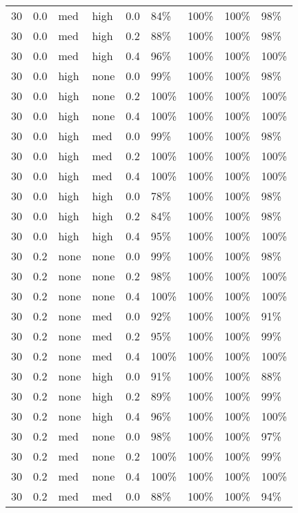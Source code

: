 \begin{longtable}{rrllrllll}
  30 & 0.0 & med & high & 0.0 & 84\% & 100\% & 100\% & 98\% \\ 
  30 & 0.0 & med & high & 0.2 & 88\% & 100\% & 100\% & 98\% \\ 
  30 & 0.0 & med & high & 0.4 & 96\% & 100\% & 100\% & 100\% \\ 
  30 & 0.0 & high & none & 0.0 & 99\% & 100\% & 100\% & 98\% \\ 
  30 & 0.0 & high & none & 0.2 & 100\% & 100\% & 100\% & 100\% \\ 
  30 & 0.0 & high & none & 0.4 & 100\% & 100\% & 100\% & 100\% \\ 
  30 & 0.0 & high & med & 0.0 & 99\% & 100\% & 100\% & 98\% \\ 
  30 & 0.0 & high & med & 0.2 & 100\% & 100\% & 100\% & 100\% \\ 
  30 & 0.0 & high & med & 0.4 & 100\% & 100\% & 100\% & 100\% \\ 
  30 & 0.0 & high & high & 0.0 & 78\% & 100\% & 100\% & 98\% \\ 
  30 & 0.0 & high & high & 0.2 & 84\% & 100\% & 100\% & 98\% \\ 
  30 & 0.0 & high & high & 0.4 & 95\% & 100\% & 100\% & 100\% \\ 
  30 & 0.2 & none & none & 0.0 & 99\% & 100\% & 100\% & 98\% \\ 
  30 & 0.2 & none & none & 0.2 & 98\% & 100\% & 100\% & 100\% \\ 
  30 & 0.2 & none & none & 0.4 & 100\% & 100\% & 100\% & 100\% \\ 
  30 & 0.2 & none & med & 0.0 & 92\% & 100\% & 100\% & 91\% \\ 
  30 & 0.2 & none & med & 0.2 & 95\% & 100\% & 100\% & 99\% \\ 
  30 & 0.2 & none & med & 0.4 & 100\% & 100\% & 100\% & 100\% \\ 
  30 & 0.2 & none & high & 0.0 & 91\% & 100\% & 100\% & 88\% \\ 
  30 & 0.2 & none & high & 0.2 & 89\% & 100\% & 100\% & 99\% \\ 
  30 & 0.2 & none & high & 0.4 & 96\% & 100\% & 100\% & 100\% \\ 
  30 & 0.2 & med & none & 0.0 & 98\% & 100\% & 100\% & 97\% \\ 
  30 & 0.2 & med & none & 0.2 & 100\% & 100\% & 100\% & 99\% \\ 
  30 & 0.2 & med & none & 0.4 & 100\% & 100\% & 100\% & 100\% \\ 
  30 & 0.2 & med & med & 0.0 & 88\% & 100\% & 100\% & 94\% \\ 

\end{longtable}
